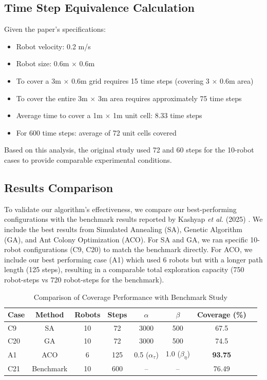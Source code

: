 \subsection{Time Step Equivalence Calculation}
Given the paper's specifications:
\begin{itemize}
    \item Robot velocity: 0.2 m/s
    \item Robot size: 0.6m $\times$ 0.6m
    \item To cover a 3m $\times$ 0.6m grid requires 15 time steps (covering 3 $\times$ 0.6m area)
    \item To cover the entire 3m $\times$ 3m area requires approximately 75 time steps
    \item Average time to cover a 1m $\times$ 1m unit cell: 8.33 time steps
    \item For 600 time steps: average of 72 unit cells covered
\end{itemize}
Based on this analysis, the original study used 72 and 60 steps for the 10-robot cases to provide comparable experimental conditions.

\subsection{Results Comparison}

To validate our algorithm's effectiveness, we compare our best-performing configurations with the benchmark results reported by Kashyap \textit{et al.} (2025) \cite{kashyap2025simulations}. 
We include the best results from Simulated Annealing (SA), Genetic Algorithm (GA), and Ant Colony Optimization (ACO). 
For SA and GA, we ran specific 10-robot configurations (C9, C20) to match the benchmark directly. 
For ACO, we include our best performing case (A1) which used 6 robots but with a longer path length (125 steps), resulting in a comparable total exploration capacity (750 robot-steps vs 720 robot-steps for the benchmark).

\begin{table}[H]
\centering
\caption{Comparison of Coverage Performance with Benchmark Study}
\begin{tabular}{@{}lccccccc@{}}
\toprule
\textbf{Case} & \textbf{Method} & \textbf{Robots} & \textbf{Steps} & \textbf{$\alpha$} & \textbf{$\beta$} & \textbf{Coverage (\%)} \\
\midrule
C9 & SA & 10 & 72 & 3000 & 500 & 67.5 \\
C20 & GA & 10 & 72 & 3000 & 500 & 74.5 \\
A1 & ACO & 6 & 125 & 0.5 ($\alpha_{\tau}$) & 1.0 ($\beta_{\eta}$) & \textbf{93.75} \\
C21 & Benchmark \cite{kashyap2025simulations} & 10 & 600 & -- & -- & 76.49 \\
\bottomrule
\end{tabular}
\label{tab:overall_comparison}
\end{table}


